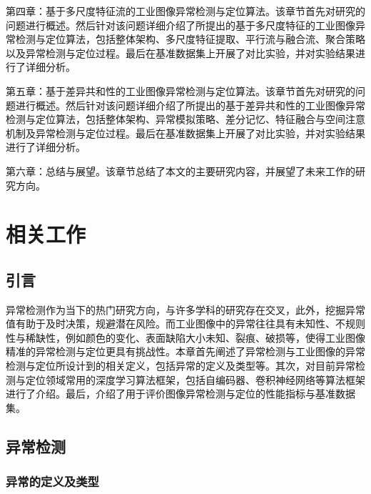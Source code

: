 \documentclass[lang=chs, degree=master, blindreview=false, adobe=false]{yanputhesis}
\begin{document}
第四章：基于多尺度特征流的工业图像异常检测与定位算法。该章节首先对研究的问题进行概述。然后针对该问题详细介绍了所提出的基于多尺度特征的工业图像异常检测与定位算法，包括整体架构、多尺度特征提取、平行流与融合流、聚合策略以及异常检测与定位过程。最后在基准数据集上开展了对比实验，并对实验结果进行了详细分析。

第五章：基于差异共和性的工业图像异常检测与定位算法。该章节首先对研究的问题进行概述。然后针对该问题详细介绍了所提出的基于差异共和性的工业图像异常检测与定位算法，包括整体架构、异常模拟策略、差分记忆、特征融合与空间注意机制及异常检测与定位过程。最后在基准数据集上开展了对比实验，并对实验结果进行了详细分析。

第六章：总结与展望。该章节总结了本文的主要研究内容，并展望了未来工作的研究方向。

\chapter{相关工作}

\section{引言}

异常检测作为当下的热门研究方向，与许多学科的研究存在交叉，此外，挖掘异常值有助于及时决策，规避潜在风险。而工业图像中的异常往往具有未知性、不规则性与稀缺性，例如颜色的变化、表面缺陷大小未知、裂痕、破损等，使得工业图像精准的异常检测与定位更具有挑战性。本章首先阐述了异常检测与工业图像的异常检测与定位所设计到的相关定义，包括异常的定义及类型等。其次，对目前异常检测与定位领域常用的深度学习算法框架，包括自编码器、卷积神经网络等算法框架进行了介绍。最后，介绍了用于评价图像异常检测与定位的性能指标与基准数据集。

\section{异常检测}
\subsection{异常的定义及类型}
\end{document}
